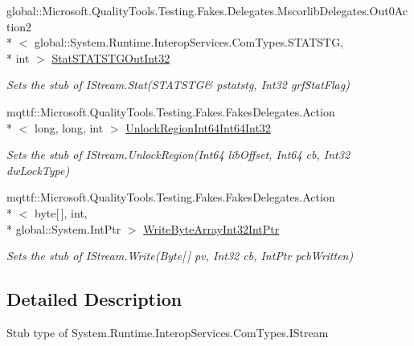 \begin{DoxyCompactItemize}
global\-::\-Microsoft.\-Quality\-Tools.\-Testing.\-Fakes.\-Delegates.\-Mscorlib\-Delegates.\-Out0\-Action2\\*
$<$ global\-::\-System.\-Runtime.\-Interop\-Services.\-Com\-Types.\-S\-T\-A\-T\-S\-T\-G, \\*
int $>$ \hyperlink{class_system_1_1_runtime_1_1_interop_services_1_1_com_types_1_1_fakes_1_1_stub_i_stream_a0dde1c3a1cf70e317622ac332ab59012}{Stat\-S\-T\-A\-T\-S\-T\-G\-Out\-Int32}
\begin{DoxyCompactList}\small\item\em Sets the stub of I\-Stream.\-Stat(S\-T\-A\-T\-S\-T\-G\& pstatstg, Int32 grf\-Stat\-Flag)\end{DoxyCompactList}\item 
mqttf\-::\-Microsoft.\-Quality\-Tools.\-Testing.\-Fakes.\-Fakes\-Delegates.\-Action\\*
$<$ long, long, int $>$ \hyperlink{class_system_1_1_runtime_1_1_interop_services_1_1_com_types_1_1_fakes_1_1_stub_i_stream_a5ee1ca6ad0d490f1c5a3ae3f0003ab89}{Unlock\-Region\-Int64\-Int64\-Int32}
\begin{DoxyCompactList}\small\item\em Sets the stub of I\-Stream.\-Unlock\-Region(\-Int64 lib\-Offset, Int64 cb, Int32 dw\-Lock\-Type)\end{DoxyCompactList}\item 
mqttf\-::\-Microsoft.\-Quality\-Tools.\-Testing.\-Fakes.\-Fakes\-Delegates.\-Action\\*
$<$ byte\mbox{[}$\,$\mbox{]}, int, \\*
global\-::\-System.\-Int\-Ptr $>$ \hyperlink{class_system_1_1_runtime_1_1_interop_services_1_1_com_types_1_1_fakes_1_1_stub_i_stream_a7f2ba578fdb95e8312daf0d3fbfd29e0}{Write\-Byte\-Array\-Int32\-Int\-Ptr}
\begin{DoxyCompactList}\small\item\em Sets the stub of I\-Stream.\-Write(\-Byte\mbox{[}$\,$\mbox{]} pv, Int32 cb, Int\-Ptr pcb\-Written)\end{DoxyCompactList}\end{DoxyCompactItemize}


\subsection{Detailed Description}
Stub type of System.\-Runtime.\-Interop\-Services.\-Com\-Types.\-I\-Stream



